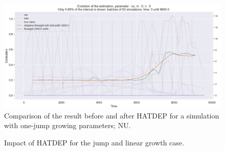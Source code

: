\begin{figure}
\centering
\includegraphics[width = 0.90 \textwidth]{../imag/chap3/2/3.png}
\caption{Comparison of the result before and after HATDEP for a simulation with one-jump growing parameters; NU.}
\label{fig:first_estimate_2_nu}
\end{figure}



















\begin{figure}
\centering
{} 
\caption{Impact of HATDEP for the jump and linear growth case.}
\label{fig:compar_kernels_3}
\end{figure}

